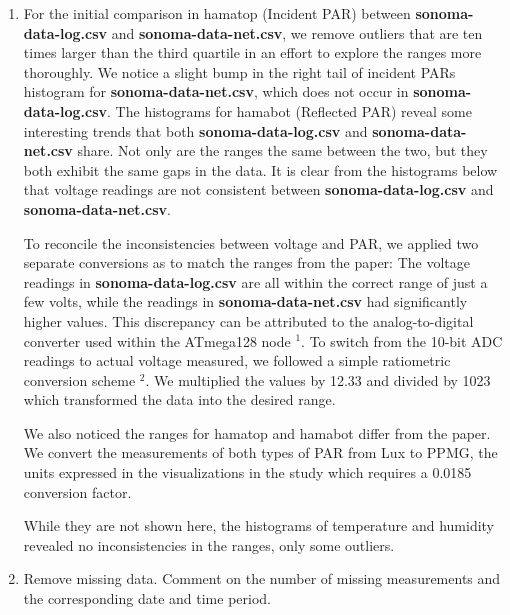 \documentclass[11pt]{article}
\begin{document}
\begin{enumerate}[label=(\alph*)]
\item
For the initial comparison in hamatop (Incident PAR) between \textbf{sonoma-data-log.csv} and \textbf{sonoma-data-net.csv}, we remove outliers that are ten times larger than the third quartile in an effort to explore the ranges more thoroughly. We notice a slight bump in the right tail of incident PARs histogram for \textbf{sonoma-data-net.csv}, which does not occur in \textbf{sonoma-data-log.csv}.
The histograms for hamabot (Reflected PAR) reveal some interesting trends that both \textbf{sonoma-data-log.csv} and \textbf{sonoma-data-net.csv} share. Not only are the ranges the same between the two, but they both exhibit the same gaps in the data.
It is clear from the histograms below that voltage readings are not consistent between \textbf{sonoma-data-log.csv} and \textbf{sonoma-data-net.csv}.

To reconcile the inconsistencies between voltage and PAR, we applied two separate conversions as to match the ranges from the paper: \newline
The voltage readings in \textbf{sonoma-data-log.csv} are all within the correct range of just a few volts, while the readings in \textbf{sonoma-data-net.csv} had significantly higher values. This discrepancy can be attributed to the analog-to-digital converter used within the ATmega128 node $^1$. To switch from the 10-bit ADC readings to actual voltage measured, we followed a simple ratiometric conversion scheme $^2$. We multiplied the values by 12.33 and divided by 1023 which transformed the data into the desired range.

We also noticed the ranges for hamatop and hamabot differ from the paper. We convert the measurements of both types of PAR from Lux to PPMG, the units expressed in the visualizations in the study which requires a 0.0185 conversion factor.


While they are not shown here, the histograms of temperature and humidity revealed no inconsistencies in the ranges, only some outliers.



\item Remove missing data. Comment on the number of missing measurements and the corresponding date and time period.


\end{enumerate}
\end{document}
